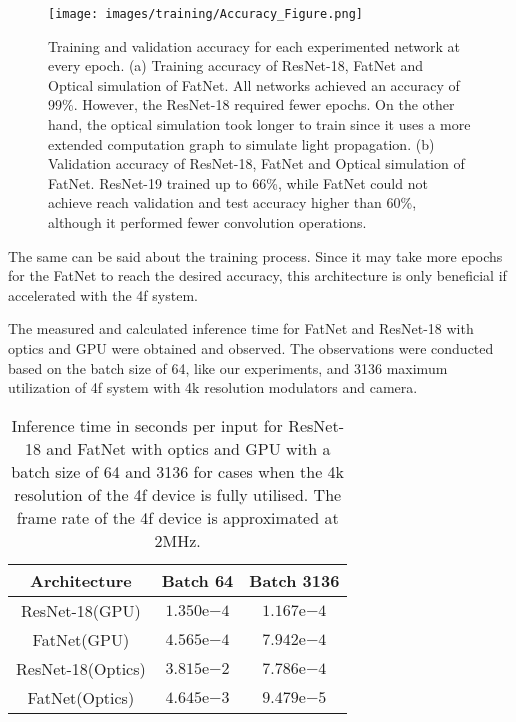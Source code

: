 \documentclass{article}
\begin{document}
\begin{figure}[H]
\centering
\texttt{[image: images/training/Accuracy\_Figure.png]}
\caption{Training and validation accuracy for each experimented network at every epoch\label{fig:acc}. (a) Training accuracy of ResNet-18, FatNet and Optical simulation of FatNet. All networks achieved an accuracy of 99\%. However, the ResNet-18 required fewer epochs. On the other hand, the optical simulation took longer to train since it uses a more extended computation graph to simulate light propagation. (b)  Validation accuracy of ResNet-18, FatNet and Optical simulation of FatNet. ResNet-19 trained up to 66\%, while FatNet could not achieve reach validation and test accuracy higher than 60\%, although it performed fewer convolution operations.}
\end{figure} 

The same can be said about the training process. Since it may take more epochs for the FatNet to reach the desired accuracy, this architecture is only beneficial if accelerated with the 4f system. 

The measured and calculated inference time for FatNet and ResNet-18 with optics and GPU were obtained and observed. The observations were conducted based on the batch size of 64, like our experiments, and 3136 maximum utilization of 4f system with 4k resolution modulators and camera. 

\begin{table}[H]
\centering
\caption{ Inference time in seconds per input for ResNet-18 and FatNet with optics and GPU with a batch size of 64 and 3136 for cases when the 4k resolution of the 4f device is fully utilised. The frame rate of the 4f device is approximated at 2MHz\cite{li_channel_2020}.}
\begin{tabular}{ccc}
\toprule
\textbf{Architecture}	& \textbf{Batch 64}	& \textbf{Batch 3136} \\
\midrule
ResNet-18(GPU)	                 	& $1.350\mathrm{e}{-4}$		& $1.167\mathrm{e}{-4}$\\
FatNet(GPU)	                     	& $4.565\mathrm{e}{-4}$		& $7.942\mathrm{e}{-4}$\\
ResNet-18(Optics)	            	& $3.815\mathrm{e}{-2}$	    & $7.786\mathrm{e}{-4}$\\
FatNet(Optics)	                	& $4.645\mathrm{e}{-3}$	    & $9.479\mathrm{e}{-5}$\\
\bottomrule
\end{tabular}
 \label{tab3}
\end{table}
\unskip
\end{document}
